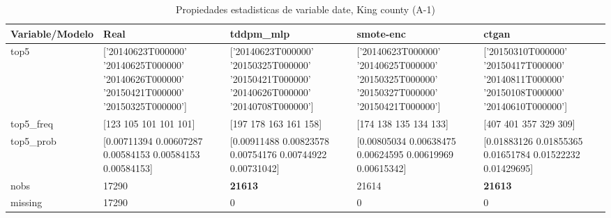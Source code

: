 \begin{table}[H]
\centering
\fontsize{8}{14}\selectfont
\caption{Propiedades  estadisticas de variable date, King county (A-1)}
\label{table-stats-king county-a-1-date}
\begin{tabular}{|l|m{10em}|m{10em}|m{10em}|m{10em}|}
\hline
 \rowcolor[gray]{0.8}
Variable/Modelo & Real & tddpm\_mlp & smote-enc & ctgan \\
\hline top5 & ['20140623T000000' '20140625T000000' '20140626T000000' '20150421T000000'
 '20150325T000000'] & ['20140623T000000' '20150325T000000' '20150421T000000' '20140626T000000'
 '20140708T000000'] & ['20140623T000000' '20140625T000000' '20150325T000000' '20150327T000000'
 '20150421T000000'] & ['20150310T000000' '20150417T000000' '20140811T000000' '20150108T000000'
 '20140610T000000'] \\
\hline top5\_freq & [123 105 101 101 101] & [197 178 163 161 158] & [174 138 135 134 133] & [407 401 357 329 309] \\
\hline top5\_prob & [0.00711394 0.00607287 0.00584153 0.00584153 0.00584153] & [0.00911488 0.00823578 0.00754176 0.00744922 0.00731042] & [0.00805034 0.00638475 0.00624595 0.00619969 0.00615342] & [0.01883126 0.01855365 0.01651784 0.01522232 0.01429695] \\
\hline nobs & 17290 & \bfseries 21613 & \cellcolor[rgb]{0.9, 0.54, 0.52} 21614 & \bfseries 21613 \\
\hline missing & 17290 & 0 & 0 & 0 \\
\hline
\end{tabular}
\end{table}
